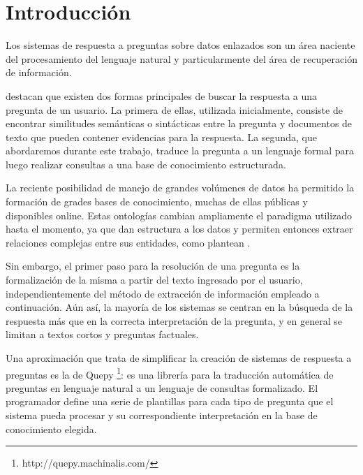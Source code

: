 \chapter*{Introducción}

Los sistemas de respuesta a preguntas sobre datos enlazados son un área naciente del procesamiento del lenguaje natural y particularmente del área de recuperación de información.

\citet{gupta_survey} destacan que existen dos formas principales de buscar la respuesta a una pregunta de un usuario. La primera de ellas, utilizada inicialmente, consiste de encontrar similitudes semánticas o sintácticas entre la pregunta y documentos de texto que pueden contener evidencias para la respuesta. La segunda, que abordaremos durante este trabajo, traduce la pregunta a un lenguaje formal para luego realizar consultas a una base de conocimiento estructurada.

La reciente posibilidad de manejo de grandes volúmenes de datos ha permitido la formación de grades bases de conocimiento, muchas de ellas públicas y disponibles online. Estas ontologías cambian ampliamente el paradigma utilizado hasta el momento, ya que dan estructura a los datos y permiten entonces extraer relaciones complejas entre sus entidades, como plantean \citet{ou_entailement}.

Sin embargo, el primer paso para la resolución de una pregunta es la formalización de la misma a partir del texto ingresado por el usuario, independientemente del método de extracción de información empleado a continuación. Aún así, la mayoría de los sistemas se centran en la búsqueda de la respuesta más que en la correcta interpretación de la pregunta, y en general se limitan a textos cortos y preguntas factuales.

Una aproximación que trata de simplificar la creación de sistemas de respuesta a preguntas es la de Quepy \footnote{http://quepy.machinalis.com/}: es una librería para la traducción automática de preguntas en lenguaje natural a un lenguaje de consultas formalizado. El programador define una serie de plantillas para cada tipo de pregunta que el sistema pueda procesar y su correspondiente interpretación en la base de conocimiento elegida.

